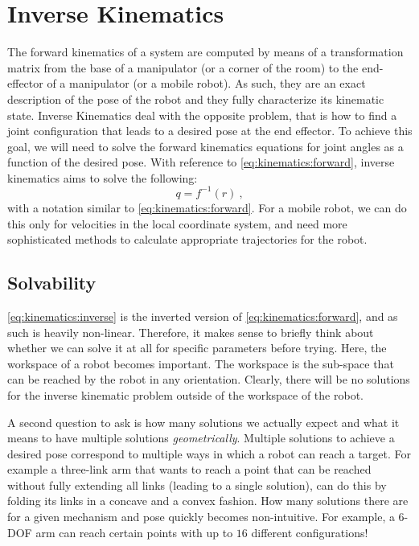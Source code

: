 \section{Inverse Kinematics}

The forward kinematics of a system are computed by means of a transformation matrix from the base of a manipulator (or a corner of the room) to the end-effector of a manipulator (or a mobile robot).
As such, they are an exact description of the pose of the robot and they fully characterize its kinematic state.
Inverse Kinematics deal with the opposite problem, that is how to find a joint configuration that leads to a desired pose at the end effector.
To achieve this goal, we will need to solve the forward kinematics equations for joint angles as a function of the desired pose.
With reference to \cref{eq:kinematics:forward}, inverse kinematics aims to solve the following:
\begin{equation}\label{eq:kinematics:inverse}
q = f^{-1} (r)\ ,
\end{equation}
with a notation similar to \cref{eq:kinematics:forward}.
For a mobile robot, we can do this only for velocities in the local coordinate system, and need more sophisticated methods to calculate appropriate trajectories for the robot.

\subsection{Solvability}

\cref{eq:kinematics:inverse} is the inverted version of \cref{eq:kinematics:forward}, and as such is heavily non-linear.
Therefore, it makes sense to briefly think about whether we can solve it at all for specific parameters before trying.
Here, the workspace of a robot becomes important. The workspace is the sub-space that can be reached by the robot in any orientation.
Clearly, there will be no solutions for the inverse kinematic problem outside of the workspace of the robot.

A second question to ask is how many solutions we actually expect and what it means to have multiple solutions \textsl{geometrically}.
Multiple solutions to achieve a desired pose correspond to multiple ways in which a robot can reach a target.
For example a three-link arm that wants to reach a point that can be reached without fully extending all links (leading to a single solution), can do this by folding its links in a concave and a convex fashion.
How many solutions there are for a given mechanism and pose quickly becomes non-intuitive.
For example, a 6-DOF arm can reach certain points with up to $16$ different configurations!


